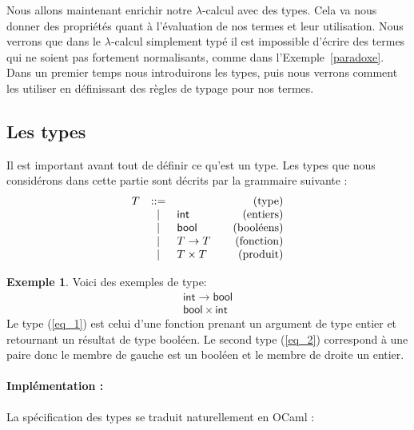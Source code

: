 \documentclass {article}
\makeatletter
\newcommand{\codefrom}[3]
           {}
\theoremstyle{definition}
\newtheorem{example}{Exemple}
\theoremstyle{remark}
\newenvironment{bnf}
               {\[\begin{array}{lcl@{\qquad}r}}
               {\end{array}\]}
\makeatother
\begin{document}
Nous allons maintenant enrichir notre $\lambda$-calcul avec des
types. Cela va nous donner des propriétés quant à l'évaluation de nos
termes et leur utilisation. Nous verrons que dans le $\lambda$-calcul
simplement typé il est impossible d'écrire des termes qui ne soient pas
fortement normalisants, comme dans l'Exemple~\ref{paradoxe}. Dans un
premier temps nous introduirons les types, puis nous verrons comment
les utiliser en définissant des règles de typage pour nos termes.


\subsection{Les types}
\label{simple_type}


\newcommand{\intg}{\ensuremath{\mathsf{int}}}
\newcommand{\bool}{\ensuremath{\mathsf{bool}}}

Il est important avant tout de définir ce qu'est un type. Les types
que nous considérons dans cette partie sont décrits par la grammaire
suivante :
%
\begin{bnf}
  T &::=& &\mbox{(type)}\\
  &|& \intg{} &\mbox{(entiers)}\\ 
  &|& \bool{} &\mbox{(booléens)}\\
  &|& T \rightarrow T &\mbox{(fonction)}\\
  &|& T \times T &\mbox{(produit)}\\
\end{bnf}

\begin{example}
  Voici des exemples de type:
  \begin{eqnarray}
    \intg \rightarrow \bool  \label{eq_1}  \\
    \bool \times \intg \label{eq_2} 
  \end{eqnarray}
  Le type (\ref{eq_1}) est celui d'une fonction prenant un argument de type entier et 
  retournant un résultat de type booléen.
  Le second type (\ref{eq_2}) correspond à une paire donc le membre de gauche est un booléen
  et le membre de droite un entier.
\end{example}

\paragraph{Implémentation :}

La spécification des types se traduit naturellement en OCaml :
%
\codefrom{typed}{lambda}{Type}
\end{document}
